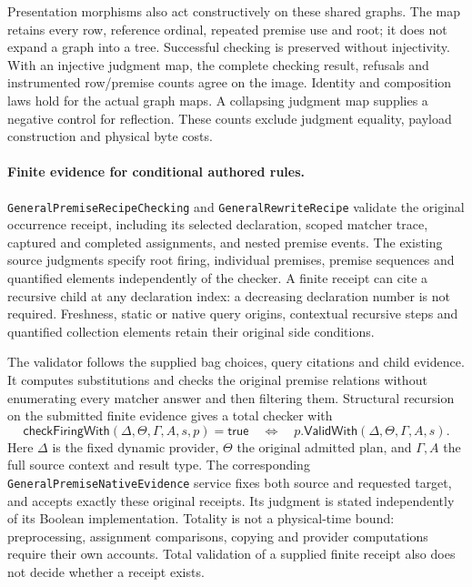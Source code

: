 \documentclass[11pt]{article}
\newcommand{\code}[1]{\nolinkurl{#1}}
\begin{document}
Presentation morphisms also act constructively on these shared graphs.
The map retains every row, reference ordinal, repeated premise use and root;
it does not expand a graph into a tree. Successful checking is preserved
without injectivity. With an injective judgment map, the complete checking
result, refusals and instrumented row/premise counts agree on the image.
Identity and composition laws hold for the actual graph maps. A collapsing
judgment map supplies a negative control for reflection. These counts exclude
judgment equality, payload construction and physical byte costs.

\paragraph{Finite evidence for conditional authored rules.}
\code{GeneralPremiseRecipeChecking} and \code{GeneralRewriteRecipe} validate the original occurrence receipt,
including its selected declaration, scoped matcher trace, captured and completed
assignments, and nested premise events. The existing source judgments specify
root firing, individual premises, premise sequences and quantified elements
independently of the checker. A finite receipt can cite a recursive child at any
declaration index: a decreasing declaration number is not required. Freshness,
static or native query origins, contextual recursive steps and quantified
collection elements retain their original side conditions.

The validator follows the supplied bag choices, query citations and child
evidence. It computes substitutions and checks the original premise
relations without enumerating every matcher answer and then filtering them.
Structural recursion on the submitted finite evidence gives a total checker
with
\[
 \mathsf{checkFiringWith}(\Delta,\Theta,\Gamma,A,s,p)=\mathsf{true}
 \quad\Longleftrightarrow\quad
 p.\mathsf{ValidWith}(\Delta,\Theta,\Gamma,A,s).
\]
Here $\Delta$ is the fixed dynamic provider, $\Theta$ the original admitted
plan, and $\Gamma,A$ the full source context and result type. The corresponding
\code{GeneralPremiseNativeEvidence} service fixes both source and requested
target, and accepts exactly these original receipts. Its judgment is stated
independently of its Boolean implementation. Totality is not a physical-time
bound: preprocessing, assignment comparisons, copying and provider
computations require their own accounts. Total validation of a supplied finite
receipt also does not decide whether a receipt exists.
\end{document}
